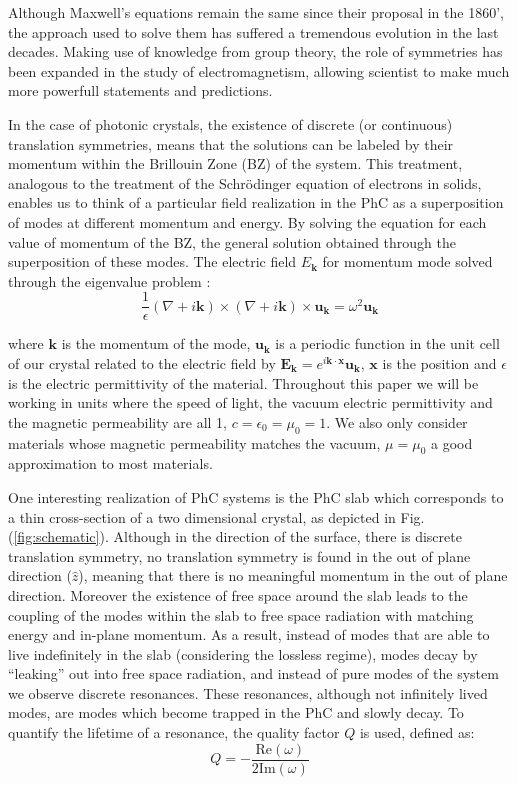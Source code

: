 

Although Maxwell's equations remain the same since their proposal in the 1860', the approach used to solve them has suffered a tremendous evolution in the last decades. Making use of knowledge from group theory, the role of symmetries has been expanded in the study of electromagnetism, allowing scientist to make much more powerfull statements and predictions.

In the case of photonic crystals, the existence of discrete (or continuous) translation symmetries, means that the solutions can be labeled by their momentum within the Brillouin Zone (BZ) of the system. This treatment, analogous to the treatment of the Schr\"{o}dinger equation of electrons in solids, enables us to think of a particular field realization in the PhC as a superposition of modes at different momentum and energy. By solving the equation for each value of momentum of the BZ, the general solution obtained through the superposition of these modes. The electric field $E_{\bm{k}}$ for momentum mode solved through the eigenvalue problem \cite{D.Joannopoulos2008}:
\begin{equation} \label{eq:Maxwell}
  \frac{1}{\epsilon} (\nabla + i\bm{k})\times (\nabla + i\bm{k})\times \bm{u}_{\bm{k}} = \omega^2  \bm{u}_{\bm{k}}
\end{equation}

\noindent where $\bm{k}$ is the momentum of the mode, $\bm{u}_{\bm{k}}$ is a periodic function in the unit cell of our crystal related to the electric field by $\bm{E}_{\bm{k}} = e^{i\bm{k}\cdot\bm{x}} \bm{u}_{\bm{k}}$, $\bm{x}$ is the position and $\epsilon$ is the electric permittivity of the material. Throughout this paper we will be working in units where the speed of light, the vacuum electric permittivity and the magnetic permeability are all 1,  $c=\epsilon_0=\mu_0=1$. We also only consider materials whose magnetic permeability matches the vacuum, $\mu = \mu_0$ a good approximation to most materials.

One interesting realization of PhC systems is the PhC slab which corresponds to a thin cross-section of a two dimensional crystal, as depicted in Fig.(\ref{fig:schematic}). Although in the direction of the surface, there is discrete translation symmetry, no translation symmetry is found in the out of plane direction ($\hat{z}$), meaning that there is no meaningful momentum in the out of plane direction. Moreover the existence of free space around the slab leads to the coupling of the modes within the slab to free space radiation with matching energy and in-plane momentum. As a result, instead of modes that are able to live indefinitely in the slab (considering the lossless regime), modes decay by ``leaking'' out into free space radiation, and instead of pure modes of the system we observe discrete resonances. These resonances, although not infinitely lived modes, are modes which become trapped in the PhC and slowly decay. To quantify the lifetime of a resonance, the quality factor $Q$ is used, defined as:
\begin{equation}
  Q = -\frac{\text{Re}(\omega)}{2\text{Im}(\omega)}
\end{equation}

